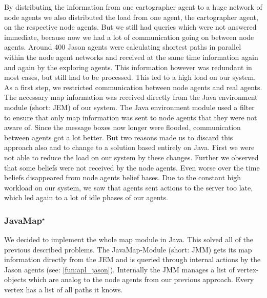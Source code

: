 By distributing the information from one cartographer agent to a huge network of node agents we also distributed the load from one agent, the cartographer agent, on the respective node agents. But we still had queries which were not answered immediate, because now we had a lot of communication going on between node agents. Around 400 Jason agents were calculating shortest paths in parallel within the node agent networks and received at the same time information again and again by the exploring agents. This information however was redundant in most cases, but still had to be processed. This led to a high load on our system. As a first step, we restricted communication between node agents and real agents. The necessary map information was received directly from the Java environment module (short: JEM) of our system. The Java environment module used a filter to ensure that only map information was sent to node agents that they were not aware of. Since the message boxes now longer were flooded, communication between agents got a lot better. But two reasons made us to discard this approach also and to change to a solution based entirely on Java. First we were not able to reduce the load on our system by these changes. Further we observed that some beliefs were not received by the node agents. Even worse over the time beliefs disappeared from node agents belief bases. Due to the constant high workload on our system, we saw that agents sent actions to the server too late, which led again to a lot of idle phases of our agents.

\subsubsection[JavaMap]{JavaMap$^\star$}\label{alg:map_javamap}
We decided to implement the whole map module in Java. This solved all of the previous described problems. The JavaMap-Module (short: JMM) gets its map information directly from the JEM and is queried through internal actions by the Jason agents (see: \autoref{fun:apl_jason}). Internally the JMM manages a list of vertex-objects which are analog to the node agents from our previous approach. Every vertex has a list of all paths it knows. 